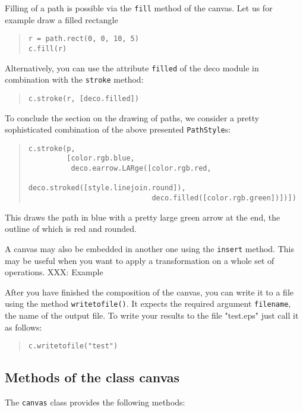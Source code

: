 Filling of a path is possible via the \verb|fill| method of the canvas.
Let us for example draw a filled rectangle 
\begin{quote}
\begin{verbatim}
r = path.rect(0, 0, 10, 5)
c.fill(r)
\end{verbatim}
\end{quote}
Alternatively, you can use the attribute \verb|filled| of the deco module
in combination with the \verb|stroke| method:
\begin{quote}
\begin{verbatim}
c.stroke(r, [deco.filled])
\end{verbatim}
\end{quote}

To conclude the section on the drawing of paths, we consider a pretty
sophisticated combination of the above presented \verb|PathStyle|s:
\begin{quote}
\begin{verbatim}
c.stroke(p,
         [color.rgb.blue,
          deco.earrow.LARge([color.rgb.red,
                             deco.stroked([style.linejoin.round]),
                             deco.filled([color.rgb.green])])])
\end{verbatim}
\end{quote}
This draws the path in blue with a pretty large green arrow at the
end, the outline of which is red and rounded.

A canvas may also be embedded in another one using the \texttt{insert}
method. This may be useful when you want to apply a transformation on
a whole set of operations. XXX: Example

After you have finished the composition of the canvas, you can
write it to a file using the method \verb|writetofile()|. It expects the
required argument \verb|filename|, the name of the output
file. To write your results to the file "test.eps" just call it as follows:
\begin{quote}
\begin{verbatim}
c.writetofile("test")
\end{verbatim}
\end{quote}


\subsection{Methods of the class canvas}

The \verb|canvas| class provides the following methods:

